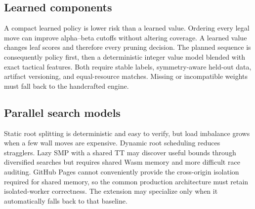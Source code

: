 \subsection{Learned components}
A compact learned policy is lower risk than a learned value. Ordering every legal move can improve alpha--beta cutoffs without altering coverage. A learned value changes leaf scores and therefore every pruning decision. The planned sequence is consequently policy first, then a deterministic integer value model blended with exact tactical features. Both require stable labels, symmetry-aware held-out data, artifact versioning, and equal-resource matches. Missing or incompatible weights must fall back to the handcrafted engine.

\subsection{Parallel search models}
Static root splitting is deterministic and easy to verify, but load imbalance grows when a few wall moves are expensive. Dynamic root scheduling reduces stragglers. Lazy SMP with a shared TT may discover useful bounds through diversified searches but requires shared Wasm memory and more difficult race auditing. GitHub Pages cannot conveniently provide the cross-origin isolation required for shared memory, so the common production architecture must retain isolated-worker correctness. The extension may specialize only when it automatically falls back to that baseline.

